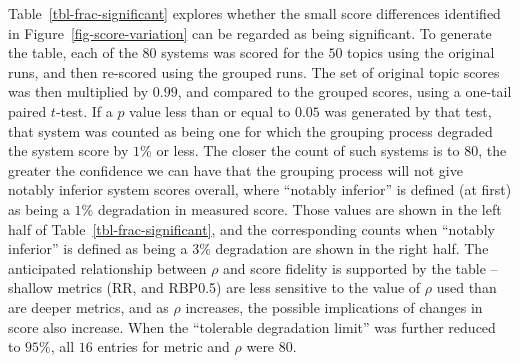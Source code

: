 
Table~\ref{tbl-frac-significant} explores whether the small score
differences identified in Figure~\ref{fig-score-variation} can be
regarded as being significant.
To generate the table, each of the $80$ systems was scored for the
$50$ topics using the original runs, and then re-scored using the
grouped runs.
The set of original topic scores was then multiplied by $0.99$, and
compared to the grouped scores, using a one-tail paired $t$-test.
If a $p$ value less than or equal to $0.05$ was generated by that
test, that system was counted as being one for which the grouping
process degraded the system score by $1$\% or less.
The closer the count of such systems is to $80$, the greater the
confidence we can have that the grouping process will not give
notably inferior system scores overall, where ``notably inferior'' is
defined (at first) as being a $1$\% degradation in measured score.
Those values are shown in the left half of
Table~\ref{tbl-frac-significant}, and the corresponding counts when
``notably inferior'' is defined as being a $3$\% degradation are
shown in the right half.
The anticipated relationship between $\rho$ and score fidelity is
supported by the table -- shallow metrics (RR, and RBP0.5) are less
sensitive to the value of $\rho$ used than are deeper metrics, and as
$\rho$ increases, the possible implications of changes in score also
increase.
When the ``tolerable degradation limit'' was further reduced to
$95$\%, all $16$ entries for metric and $\rho$ were $80$.

